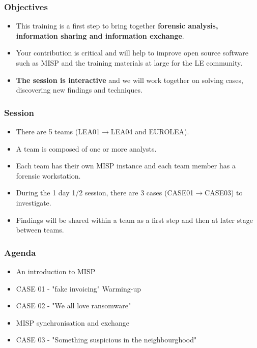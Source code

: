 
\begin{frame}[t,plain]
\titlepage
\end{frame}

\begin{frame}
\frametitle{Objectives}
        \begin{itemize}
                \item This training is a first step to bring together {\bf forensic analysis, information sharing and information exchange}.
                \item Your contribution is critical and will help to improve open source software such as MISP and the training materials at large for the LE community.
                \item {\bf The session is interactive} and we will work together on solving cases, discovering new findings and techniques.
        \end{itemize}
\end{frame}

\begin{frame}
\frametitle{Session}
        \begin{itemize}
                \item There are 5 teams (LEA01$\rightarrow$LEA04 and EUROLEA).
                \item A team is composed of one or more analysts.
                \item Each team has their own MISP instance and each team member has a forensic workstation.
                \item During the 1 day 1/2 session, there are 3 cases (CASE01$\rightarrow$CASE03) to investigate.
                \item Findings will be shared within a team as a first step and then at later stage between teams.
        \end{itemize}
\end{frame}

\begin{frame}
        \frametitle{Agenda}
        \begin{itemize}
                \item An introduction to MISP
                \item CASE 01 - "fake invoicing" Warming-up
                \item CASE 02 - "We all love ransomware"
                \item MISP synchronisation and exchange
                \item CASE 03 - "Something suspicious in the neighbourghood"
        \end{itemize}
\end{frame}

